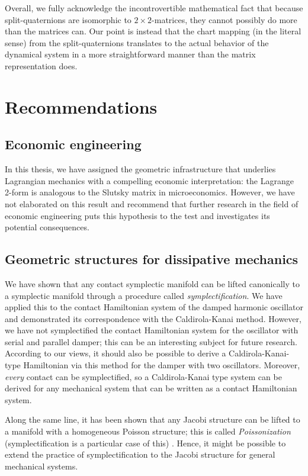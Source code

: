 Overall, we fully acknowledge the incontrovertible mathematical fact that because split-quaternions are isomorphic to $2\times2$-matrices, they cannot possibly do more than the matrices can. Our point is instead that the chart mapping (in the literal sense) from the split-quaternions translates to the actual behavior of the dynamical system in a more straightforward manner than the matrix representation does.

\section*{Recommendations}

\subsection*{Economic engineering}
In this thesis, we have assigned the geometric infrastructure that underlies Lagrangian mechanics with a compelling economic interpretation: the Lagrange 2-form is analogous to the Slutsky matrix in microeconomics. However, we have not elaborated on this result and recommend that further research in the field of economic engineering puts this hypothesis to the test and investigates its potential consequences.

\subsection*{Geometric structures for dissipative mechanics}
We have shown that any contact symplectic manifold can be lifted canonically to a symplectic manifold through a procedure called \emph{symplectification}. We have applied this to the contact Hamiltonian system of the damped harmonic oscillator and demonstrated its correspondence with the Caldirola-Kanai method. However, we have not symplectified the contact Hamiltonian system for the oscillator with serial and parallel damper; this can be an interesting subject for future research. According to our views, it should also be possible to derive a Caldirola-Kanai-type Hamiltonian via this method for the damper with two oscillators. Moreover, \emph{every} contact can be symplectified, so a Caldirola-Kanai type system can be derived for any mechanical system that can be written as a contact Hamiltonian system.

Along the same line, it has been shown that any Jacobi structure can be lifted to a manifold with a homogeneous Poisson structure; this is called \emph{Poissonization} (symplectification is a particular case of this) \cite{marle1991}. Hence, it might be possible to extend the practice of symplectification to the Jacobi structure for general mechanical systems. 

